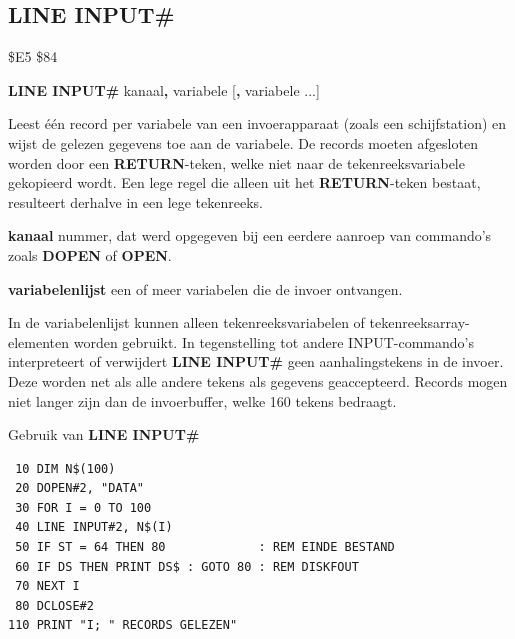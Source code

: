 
\newpage
\subsection{LINE INPUT\#}
\begin{description}[leftmargin=2cm,style=nextline]
\item [Token:]    \$E5 \$84

\item [Formaat:]   {\bf LINE INPUT\#} kanaal{\bf,} variabele [{\bf,} variabele ...]

\item [Gebruik:]    Leest één record per variabele van een invoerapparaat (zoals een schijfstation) en wijst de gelezen gegevens toe aan de variabele.                  De records moeten afgesloten worden door een {\bf RETURN}-teken, welke niet naar de tekenreeksvariabele gekopieerd wordt. Een lege regel die alleen uit het {\bf RETURN}-teken bestaat, resulteert derhalve in een lege tekenreeks.

                  {\bf kanaal} nummer, dat werd opgegeven bij een eerdere aanroep van commando's zoals {\bf DOPEN} of {\bf OPEN}.

                  {\bf variabelenlijst} een of meer variabelen die de invoer ontvangen.

\item [Opmerkingen:]  In de variabelenlijst kunnen alleen tekenreeksvariabelen of tekenreeksarray-elementen worden gebruikt. In tegenstelling tot andere INPUT-commando's interpreteert of verwijdert {\bf LINE INPUT\#} geen aanhalingstekens in de invoer. Deze worden net als alle andere tekens als gegevens geaccepteerd.                  Records mogen niet langer zijn dan de invoerbuffer, welke 160 tekens bedraagt.

\item [Voorbeeld:]  Gebruik van {\bf LINE INPUT\#}

\begin{tcolorbox}[colback=black,coltext=white]
\verbatimfont{\codefont}
\begin{verbatim}
 10 DIM N$(100)
 20 DOPEN#2, "DATA"
 30 FOR I = 0 TO 100
 40 LINE INPUT#2, N$(I)
 50 IF ST = 64 THEN 80             : REM EINDE BESTAND
 60 IF DS THEN PRINT DS$ : GOTO 80 : REM DISKFOUT
 70 NEXT I
 80 DCLOSE#2
110 PRINT "I; " RECORDS GELEZEN"
\end{verbatim}
\end{tcolorbox}
\end{description}

